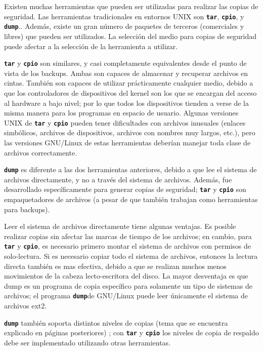 ﻿\documentclass[12pt]{article}
\begin{document}
Existen muchas herramientas que pueden ser utilizadas para realizar las copias 
de seguridad. Las herramientas tradicionales en entornos UNIX 
son \texttt{\textbf{tar}}, \texttt{\textbf{cpio}}, y
	\texttt{\textbf{dump}}.. Además, existe un gran número de paquetes de terceros 
(comerciales y libres) que pueden ser utilizados. La selección del medio para 
copias de seguridad puede afectar a la selección de la herramienta a utilizar.

	 \texttt{\textbf{tar}} y \texttt{\textbf{cpio}}
son similares, y casi completamente equivalentes desde el punto de 
vista de los backups. Ambas son capaces de almacenar y recuperar 
archivos en cintas. También son capaces de utilizar 
prácticamente cualquier medio, debido a que los controladores de dispositivos del kernel son 
los que se encargan del acceso al hardware a bajo nivel; por lo que todos los dispositivos
tienden a verse de la misma manera para los programas en espacio de usuario.
Algunas versiones UNIX de \texttt{\textbf{tar}}
	y \texttt{\textbf{cpio}}
pueden tener dificultades con archivos inusuales 
(enlaces simbólicos, archivos de dispositivos, archivos con nombres
muy largos, etc.), pero las versiones GNU/Linux de estas herramientas deberían 
manejar toda clase de archivos correctamente.

	 \texttt{\textbf{dump}}
es diferente a las dos herramientas anteriores, debido a que lee el 
sistema de archivos directamente, y no a través del sistema de archivos. 
Además, fue desarrollado específicamente para generar copias de seguridad;
 \texttt{\textbf{tar}}
	y \texttt{\textbf{cpio}} son empaquetadores de archivos (a pesar de que también trabajan como 
herramientas para backups).

	

Leer el sistema de archivos directamente tiene algunas ventajas. Es posible 
realizar copias sin afectar las marcas de tiempo de los archivos; 
en cambio, para \texttt{\textbf{tar}} y \texttt{\textbf{cpio}}, es necesario primero montar el 
sistema de archivos con permisos de solo-lectura. Si es necesario copiar 
todo el sistema de archivos, entonces la lectura directa también es mas efectiva,
debido a que se realizan 
muchos menos movimientos de la cabeza lecto-escritora del disco. La mayor desventaja
es que dump es un programa de copia específico para solamente un tipo de sistemas
de archivos;
el programa \texttt{\textbf{dump}}de GNU/Linux puede leer únicamente el sistema
de archivos ext2.

	 \texttt{\textbf{dump}}
también soporta distintos niveles de copias (tema que se encuentra
explicado en páginas posteriores)
; con \texttt{\textbf{tar}} y \texttt{\textbf{cpio}} los niveles de copia de respaldo debe 
ser implementado utilizando otras herramientas.
\end{document}
